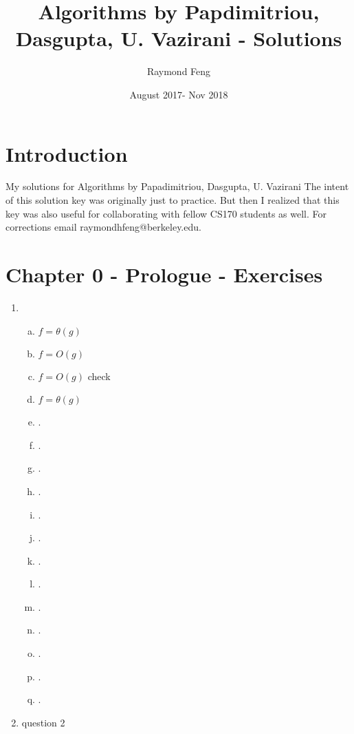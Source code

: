 \documentclass{article}
\title{Algorithms by Papdimitriou, Dasgupta, U. Vazirani - Solutions}
\author{Raymond Feng}
\date{August 2017- Nov 2018}
\begin{document}
\maketitle

\setcounter{section}{-2}
\section{Introduction}
My solutions for Algorithms by Papadimitriou, Dasgupta, U. Vazirani
The intent of this solution key was originally just to practice. But then I realized that this key was also useful for collaborating with fellow CS170 students as well. For corrections email raymondhfeng@berkeley.edu.

\setcounter{section}{-1}
\section{Chapter 0 - Prologue - Exercises}
\begin{enumerate}[(0.1)] %
\item \begin{enumerate}[(a)] %
        \item $f = \theta(g)$
        \item $f=O(g)$
        \item $f=O(g)$ check
        \item $f=\theta(g)$
        \item .
        \item .
        \item .
        \item .
        \item .
        \item .
        \item .
        \item .
        \item .
        \item .
        \item .
        \item .
        \item .
        \end{enumerate}
\item question 2
\end{enumerate}



\subsection{}
\end{document}
